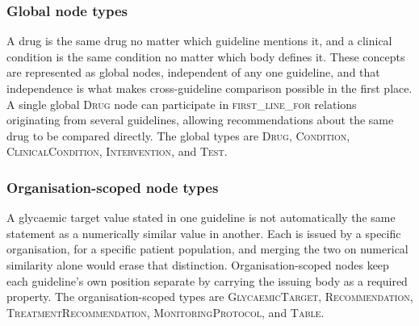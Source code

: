 \subsubsection{Global node types}
A drug is the same drug no matter which guideline mentions it, and a clinical condition is the same condition no matter which body defines it. These concepts are represented as global nodes, independent of any one guideline, and that independence is what makes cross-guideline comparison possible in the first place. A single global \textsc{Drug} node can participate in \textsc{first\_line\_for} relations originating from several guidelines, allowing recommendations about the same drug to be compared directly. The global types are \textsc{Drug}, \textsc{Condition}, \textsc{ClinicalCondition}, \textsc{Intervention}, and \textsc{Test}.

\subsubsection{Organisation-scoped node types}
A glycaemic target value stated in one guideline is not automatically the same statement as a numerically similar value in another. Each is issued by a specific organisation, for a specific patient population, and merging the two on numerical similarity alone would erase that distinction. Organisation-scoped nodes keep each guideline's own position separate by carrying the issuing body as a required property. The organisation-scoped types are
\textsc{GlycaemicTarget}, \textsc{Recommendation},
\textsc{TreatmentRecommendation}, \textsc{MonitoringProtocol},
and \textsc{Table}.

